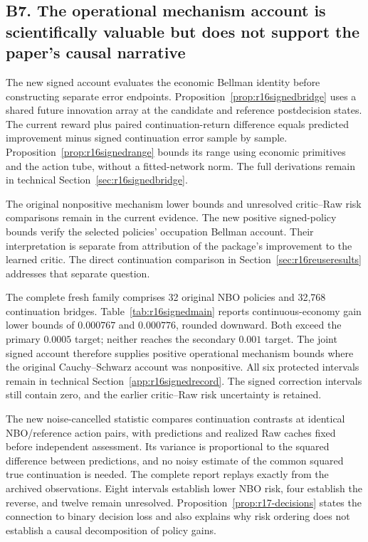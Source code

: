 \subsection*{B7. The operational mechanism account is scientifically valuable but does not support the paper's causal narrative}\label{resp:B7}
The new signed account evaluates the economic Bellman identity before constructing separate error endpoints. Proposition~\ref{prop:r16signedbridge} uses a shared future innovation array at the candidate and reference postdecision states. The current reward plus paired continuation-return difference equals predicted improvement minus signed continuation error sample by sample. Proposition~\ref{prop:r16signedrange} bounds its range using economic primitives and the action tube, without a fitted-network norm. The full derivations remain in technical Section~\ref{sec:r16signedbridge}.

The original nonpositive mechanism lower bounds and unresolved critic--Raw risk comparisons remain in the current evidence. The new positive signed-policy bounds verify the selected policies' occupation Bellman account. Their interpretation is separate from attribution of the package's improvement to the learned critic. The direct continuation comparison in Section~\ref{sec:r16reuseresults} addresses that separate question.

The complete fresh family comprises 32 original NBO policies and 32,768 continuation bridges. Table~\ref{tab:r16signedmain} reports continuous-economy gain lower bounds of $0.000767$ and $0.000776$, rounded downward. Both exceed the primary $0.0005$ target; neither reaches the secondary $0.001$ target. The joint signed account therefore supplies positive operational mechanism bounds where the original Cauchy--Schwarz account was nonpositive. All six protected intervals remain in technical Section~\ref{app:r16signedrecord}. The signed correction intervals still contain zero, and the earlier critic--Raw risk uncertainty is retained.


The new noise-cancelled statistic compares continuation contrasts at identical NBO/reference action pairs, with predictions and realized Raw caches fixed before independent assessment. Its variance is proportional to the squared difference between predictions, and no noisy estimate of the common squared true continuation is needed. The complete report replays exactly from the archived observations. Eight intervals establish lower NBO risk, four establish the reverse, and twelve remain unresolved. Proposition~\ref{prop:r17-decisions} states the connection to binary decision loss and also explains why risk ordering does not establish a causal decomposition of policy gains.

